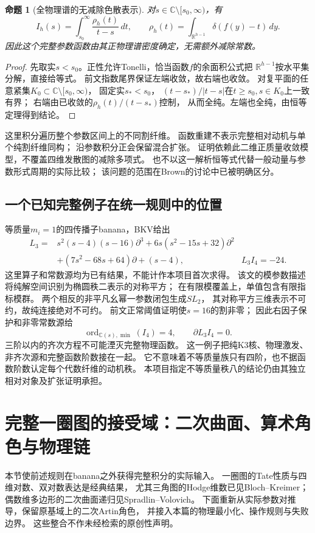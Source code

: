 \documentclass[11pt,a4paper]{ctexart}
\theoremstyle{cnplain}\newtheorem{theorem}{定理}[section]
\newtheorem{proposition}[theorem]{命题}
\theoremstyle{definition}\newtheorem{definition}[theorem]{定义}
\theoremstyle{remark}\newtheorem{remark}[theorem]{注}
\begin{document}
\begin{proposition}[全物理谱的无减除色散表示]\label{prop:dispersion}
对$s\in\mathbb C\setminus[s_0,\infty)$，有
\[
 I_h(s)=\int_{s_0}^{\infty}\frac{\rho_h(t)}{t-s}\,dt,
 \qquad
 \rho_h(t)=\int_{\mathbb R^{h-1}}\delta(f(y)-t)\,dy .
\]
因此这个完整参数函数由其正物理谱密度确定，无需额外减除常数。
\end{proposition}
\begin{proof}
先取实$s<s_0$。正性允许Tonelli，恰当函数$f$的余面积公式把
$\mathbb R^{h-1}$按水平集分解，直接给等式。
前文指数尾界保证左端收敛，故右端也收敛。
对复平面的任意紧集$K_0\subset\mathbb C\setminus[s_0,\infty)$，
固定实$s_*<s_0$，
$(t-s_*)/|t-s|$在$t\ge s_0,s\in K_0$上一致有界；
右端由已收敛的$\rho_h(t)/(t-s_*)$控制，
从而全纯。左端也全纯，由恒等定理得到结论。
\end{proof}
这里积分遍历整个参数区间上的不同割纤维。
函数重建不表示完整相对动机与单个纯割纤维同构；
沿参数积分正会保留混合扩张。
证明依赖此二维正质量收敛模型，不覆盖四维发散图的减除多项式。
也不以这一解析恒等式代替一般动量与参数形式周期的实际比较；
该问题的范围在Brown的讨论中已被明确区分\cite[\S10.2]{brownamp}。

\subsection{一个已知完整例子在统一规则中的位置}
等质量$m_i=1$的四传播子banana，BKV给出\cite[Theorem2.2.1]{BKV}
\begin{align*}
 L_3={}&s^2(s-4)(s-16)\partial^3
       +6s(s^2-15s+32)\partial^2\\
      &+(7s^2-68s+64)\partial+(s-4),
 &L_3I_4=-24 .
\end{align*}
这里算子和常数源均为已有结果，不能计作本项目首次求得。
该文的模参数描述将纯解空间识别为椭圆秩二表示的对称平方；
在有限模覆盖上，单值包含有限指标模群。
两个相反的非平凡幺幂一参数闭包生成$SL_2$，
其对称平方三维表示不可约，故纯连接绝对不可约。
前文正常阈值证明使$s=16$的割非零；
因此右因子保护和非零常数源给
\[
  \operatorname{ord}_{\mathbb C(s),\min}(I_4)=4,
  \qquad \partial L_3 I_4=0 .
\]
三阶以内的齐次方程不可能湮灭完整物理函数。
这一例子把纯K3核、物理激发、非齐次源和完整函数阶数接在一起。
它不意味着不等质量族只有四阶，也不据函数阶数认定每个代数纤维的动机秩。
本项目指定不等质量秩八的结论仍由其独立相对对象及扩张证明承担。

\section{完整一圈图的接受域：二次曲面、算术角色与物理链}
\label{sec:oneloop}
本节使前述规则在banana之外获得完整积分的实际输入。
一圈图的Tate性质与四维对数、双对数表达是经典结果，
尤其三角图的Hodge维数已见Bloch--Kreimer\cite[\S7--10]{BKone}；
偶数维多边形的二次曲面递归见Spradlin--Volovich\cite{SVone}。
下面重新从实际参数对推导，保留原基域上的二次Artin角色，
并接入本篇的物理最小化、操作规则与失败边界。
这些整合不作未经检索的原创性声明。
\end{document}
